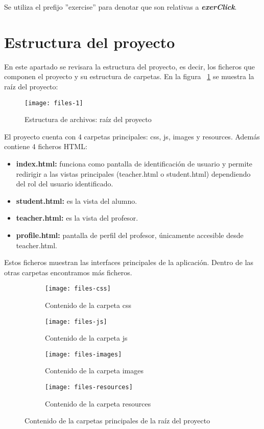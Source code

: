 Se utiliza el prefijo ''exercise'' para denotar que son relativas a \textit{\textbf{exerClick}}.\\

\section{Estructura del proyecto}
\label{diseno-e-implementacion:estructura}

En este apartado se revisara la estructura del proyecto, es decir, los ficheros que componen el proyecto y su estructura de carpetas. En la figura ~\ref{fig:files-1} se muestra la raíz del proyecto:\\

\noindent
\begin{figure}[!htbp]
	\texttt{[image: files-1]}
	\caption{Estructura de archivos: raíz del proyecto}
	\label{fig:files-1}
\end{figure}

El proyecto cuenta con 4 carpetas principales: css, js, images y resources. Además contiene 4 ficheros HTML:

\begin{itemize}
\item \textbf{index.html:} funciona como pantalla de identificación de usuario y permite redirigir a las vistas principales (teacher.html o student.html) dependiendo del rol del usuario identificado.
\item \textbf{student.html:} es la vista del alumno.
\item \textbf{teacher.html:} es la vista del profesor.
\item \textbf{profile.html:} pantalla de perfil del profesor, únicamente accesible desde teacher.html.
\end{itemize}

Estos ficheros muestran las interfaces principales de la aplicación. Dentro de las otras carpetas encontramos más ficheros.

\noindent
\begin{figure}[!htbp]
\begin{subfigure}[!htbp]{0.5\textwidth}
	\texttt{[image: files-css]}
	\caption{Contenido de la carpeta css}
	\label{fig:files-css}
\end{subfigure}
%
\begin{subfigure}[!htbp]{0.5\textwidth}
	\texttt{[image: files-js]}
	\caption{Contenido de la carpeta js}
	\label{fig:files-js}
\end{subfigure}
%
\begin{subfigure}[!htbp]{0.5\textwidth}
	\texttt{[image: files-images]}
	\caption{Contenido de la carpeta images}
	\label{fig:files-images}
\end{subfigure}
%
\begin{subfigure}[!htbp]{0.5\textwidth}
	\texttt{[image: files-resources]}
	\caption{Contenido de la carpeta resources}
	\label{fig:files-resources}
\end{subfigure}

\caption{Contenido de la carpetas principales de la raíz del proyecto}
\label{fig:files-2}
\end{figure}


